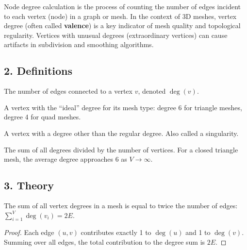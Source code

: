 Node degree calculation is the process of counting the number of edges incident to each vertex (node) in a graph or mesh. In the context of 3D meshes, vertex degree (often called \textbf{valence}) is a key indicator of mesh quality and topological regularity. Vertices with unusual degrees (extraordinary vertices) can cause artifacts in subdivision and smoothing algorithms\cite{botsch2010}.

\subsection{2. Definitions}

\begin{definition}\label{def:valence}
The number of edges connected to a vertex $v$, denoted $\deg(v)$.
\end{definition}

\begin{definition}\label{def:regular_vertex}
A vertex with the ``ideal'' degree for its mesh type: degree 6 for triangle meshes, degree 4 for quad meshes.
\end{definition}

\begin{definition}\label{def:extraordinary_vertex}
A vertex with a degree other than the regular degree. Also called a singularity.
\end{definition}

\begin{definition}\label{def:average_degree}
The sum of all degrees divided by the number of vertices. For a closed triangle mesh, the average degree approaches 6 as $V \to \infty$.
\end{definition}

\subsection{3. Theory}

\begin{theorem}\label{thm:handshaking}
The sum of all vertex degrees in a mesh is equal to twice the number of edges: $\sum_{i=1}^{V} \deg(v_i) = 2E$.
\end{theorem}

\begin{proof}
Each edge $(u, v)$ contributes exactly 1 to $\deg(u)$ and 1 to $\deg(v)$. Summing over all edges, the total contribution to the degree sum is $2E$.
\end{proof}

